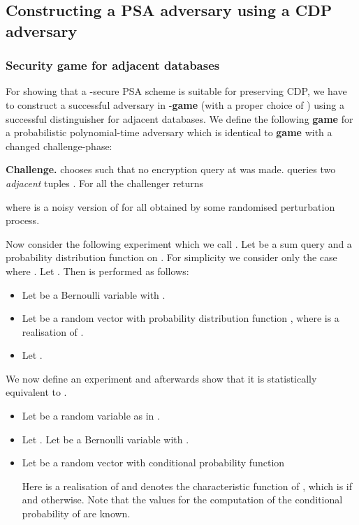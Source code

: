 \documentclass[10pt]{extarticle}
\begin{document}
\subsection{Constructing a PSA adversary using a CDP adversary}

\subsubsection{Security game for adjacent databases}
For showing that a -secure PSA scheme is suitable for preserving {\upshape\sffamily CDP}, we have to construct a successful adversary in -\textbf{game}  (with a proper choice of ) using a successful distinguisher for adjacent databases. We define the following \textbf{game}  for a probabilistic polynomial-time adversary  which is identical to \textbf{game}  with a changed challenge-phase:
\begin{description}
\item\textbf{Challenge.}  chooses  such that no encryption query at  was made.  queries two \textit{adjacent} tuples . For all  the challenger returns 

where  is a noisy version of  for all  obtained by some randomised perturbation process.
\end{description}
Now consider the following experiment which we call . Let  be a sum query and  a probability distribution function on . For simplicity we consider only the case where . Let . Then  is performed as follows:
\begin{itemize} 
\item Let  be a Bernoulli variable with .
\item Let  be a random vector with probability distribution function , where  is a realisation of .
\item Let .
\end{itemize}
We now define an experiment  and afterwards show that it is statistically equivalent to .
\begin{itemize} 
\item Let  be a random variable as in .
\item Let . Let  be a Bernoulli variable with .
\item Let  be a random vector with conditional probability function

Here  is a realisation of  and  denotes the characteristic function of , which is  if  and  otherwise. Note that the values  for the computation of the conditional probability of  are known.
\end{itemize}
\end{document}
